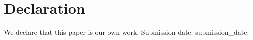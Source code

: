 \section*{Declaration}
We declare that this paper is our own work. Submission date: {{submission_date}}.
